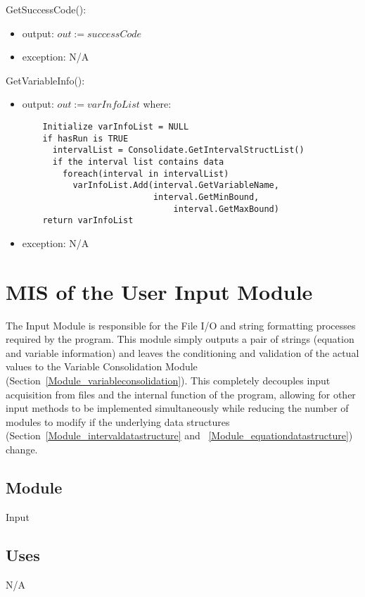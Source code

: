 \documentclass[12pt, titlepage]{article}
\begin{document}
\noindent GetSuccessCode():
\begin{itemize}
	\item output: $out := successCode$
	\item exception: N/A
\end{itemize}

\noindent GetVariableInfo():
\begin{itemize}
	\item output: $out := varInfoList$ where:
	\begin{lstlisting}
	Initialize varInfoList = NULL
	if hasRun is TRUE
	  intervalList = Consolidate.GetIntervalStructList()
	  if the interval list contains data
	    foreach(interval in intervalList)
	      varInfoList.Add(interval.GetVariableName, 
	                      interval.GetMinBound, 
                              interval.GetMaxBound)
    return varInfoList
	\end{lstlisting}
	\item exception: N/A
\end{itemize}

\newpage

\section{MIS of the User Input Module} 
\label{Module_userinput}
The Input Module is responsible for the File I/O and string formatting 
processes required by the program. This module simply outputs a pair of strings 
(equation and variable information) and leaves the conditioning and validation 
of the actual values to the Variable Consolidation Module 
(Section~\ref{Module_variableconsolidation}). This completely decouples input 
acquisition from files and the internal function of the program, allowing for 
other input methods to be implemented simultaneously while reducing the number 
of modules to modify if the underlying data structures 
(Section~\ref{Module_intervaldatastructure} and 
~\ref{Module_equationdatastructure}) change.

\subsection{Module}

Input

\subsection{Uses}

N/A
\end{document}
